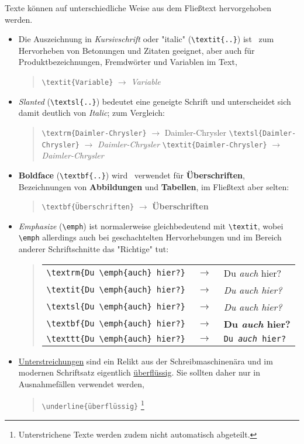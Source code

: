 Texte können auf unterschiedliche Weise aus dem Fließtext hervorgehoben werden.
\begin{itemize}
%
\item Die Auszeichnung in \textit{Kursivschrift} oder "italic" (\verb!\textit{..}!) ist \va\ zum Hervorheben von
Betonungen und Zitaten geeignet, aber auch für
Produktbezeichnungen, Fremdwörter und Variablen im Text, \zB
%
\begin{quote}
\verb!\textit{Variable}! $\rightarrow$ \textit{Variable}
\end{quote}
%
\item \textsl{Slanted} %
(\verb!\textsl{..}!) bedeutet eine geneigte Schrift und
unterscheidet sich damit deutlich von \textit{Italic}; 
zum Vergleich:
%
\begin{quote}
\verb!\textrm{Daimler-Chrysler}! $\rightarrow$ \textrm{Daimler-Chrysler} \newline%
\verb!\textsl{Daimler-Chrysler}! $\rightarrow$ \textsl{Daimler-Chrysler} \newline%
\verb!\textit{Daimler-Chrysler}! $\rightarrow$ \textit{Daimler-Chrysler}
\end{quote}
%
\item \textbf{Boldface} (\verb!\textbf{..}!) wird \ia\ verwendet für 
\textbf{Überschriften}, Bezeichnungen von \textbf{Abbildungen} und 
\textbf{Tabellen}, im Fließtext aber selten:
%
\begin{quote}
\verb!\textbf{Überschriften}! $\rightarrow$ \textbf{Überschriften}
\end{quote}
%
\item \emph{Emphasize} (\verb!\emph!) %
ist normalerweise gleichbedeutend mit \verb!\textit!, wobei
\verb!\emph! allerdings auch bei geschachtelten
Hervorhebungen und im Bereich anderer Schriftschnitte das
"Richtige" tut: 
%
\begin{quote}
\setlength{\tabcolsep}{0pt}%
\begin{tabular}{lcl}
\verb!\textrm{Du \emph{auch} hier?}! & $\;\rightarrow\;$ &
    \textrm{Du \emph{auch} hier?}
\\
\verb!\textit{Du \emph{auch} hier?}! & $\;\rightarrow\;$ &
    \textit{Du \emph{auch} hier?} 
\\
\verb!\textsl{Du \emph{auch} hier?}! & $\;\rightarrow\;$ & 
    \textsl{Du \emph{auch} hier?}
\\
\verb!\textbf{Du \emph{auch} hier?}! & $\;\rightarrow\;$ & 
    \textbf{Du \emph{auch} hier?}
\\
\verb!\texttt{Du \emph{auch} hier?}! & $\;\rightarrow\;$ & 
    \texttt{Du \emph{auch} hier?}
\end{tabular}
\end{quote}
%
\item \underline{Unterstreichungen} sind ein Relikt aus der 
Schreibmaschinenära und im modernen Schriftsatz
eigentlich \underline{überflüssig}. Sie sollten daher nur in
Ausnahmefällen verwendet werden, \zB
%
\begin{quote}
\verb!\underline{überflüssig}!%
\footnote{Unterstrichene Texte werden zudem nicht automatisch abgeteilt.}
\end{quote}
%
\end{itemize}



